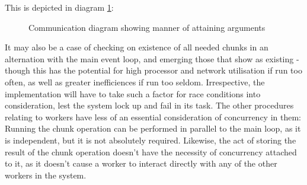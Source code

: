 This is depicted in diagram \cref{fig:argument-attain}:

\begin{figure}
  \centering
  
  \caption{Communication diagram showing manner of attaining arguments}
  \label{fig:argument-attain}
\end{figure}

It may also be a case of checking on existence of all needed chunks in
an alternation with the main event loop, and emerging those that show as
existing - though this has the potential for high processor and network
utilisation if run too often, as well as greater inefficiences if run
too seldom. Irrespective, the implementation will have to take such a
factor for race conditions into consideration, lest the system lock up
and fail in its task. The other procedures relating to workers have less
of an essential consideration of concurrency in them: Running the chunk
operation can be performed in parallel to the main loop, as it is
independent, but it is not absolutely required. Likewise, the act of
storing the result of the chunk operation doesn't have the necessity of
concurrency attached to it, as it doesn't cause a worker to interact
directly with any of the other workers in the system.